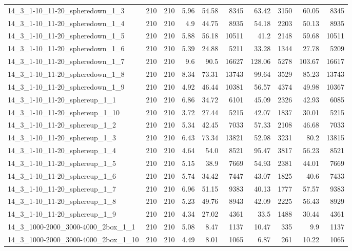 \begin{center}
\begin{scriptsize}
\begin{longtable}{lrrrrrrrrr}
14\_3\_1-10\_11-20\_spheredown\_1\_3 & 210 & 210 & 5.96 & 54.58 & 8345 & 63.42 & 3150 & 60.05 & 8345\\
14\_3\_1-10\_11-20\_spheredown\_1\_4 & 210 & 210 & 4.9 & 44.75 & 8935 & 54.18 & 2203 & 50.13 & 8935\\
14\_3\_1-10\_11-20\_spheredown\_1\_5 & 210 & 210 & 5.88 & 56.18 & 10511 & 41.2 & 2148 & 59.68 & 10511\\
14\_3\_1-10\_11-20\_spheredown\_1\_6 & 210 & 210 & 5.39 & 24.88 & 5211 & 33.28 & 1344 & 27.78 & 5209\\
14\_3\_1-10\_11-20\_spheredown\_1\_7 & 210 & 210 & 9.6 & 90.5 & 16627 & 128.06 & 5278 & 103.67 & 16617\\
14\_3\_1-10\_11-20\_spheredown\_1\_8 & 210 & 210 & 8.34 & 73.31 & 13743 & 99.64 & 3529 & 85.23 & 13743\\
14\_3\_1-10\_11-20\_spheredown\_1\_9 & 210 & 210 & 4.92 & 46.44 & 10381 & 56.57 & 4374 & 49.98 & 10367\\
14\_3\_1-10\_11-20\_sphereup\_1\_1 & 210 & 210 & 6.86 & 34.72 & 6101 & 45.09 & 2326 & 42.93 & 6085\\
14\_3\_1-10\_11-20\_sphereup\_1\_10 & 210 & 210 & 3.72 & 27.44 & 5215 & 42.07 & 1837 & 30.01 & 5215\\
14\_3\_1-10\_11-20\_sphereup\_1\_2 & 210 & 210 & 5.34 & 42.45 & 7033 & 57.33 & 2108 & 46.68 & 7033\\
14\_3\_1-10\_11-20\_sphereup\_1\_3 & 210 & 210 & 6.43 & 73.34 & 13821 & 52.98 & 3231 & 80.2 & 13815\\
14\_3\_1-10\_11-20\_sphereup\_1\_4 & 210 & 210 & 4.64 & 54.0 & 8521 & 95.47 & 3817 & 56.23 & 8521\\
14\_3\_1-10\_11-20\_sphereup\_1\_5 & 210 & 210 & 5.15 & 38.9 & 7669 & 54.93 & 2381 & 44.01 & 7669\\
14\_3\_1-10\_11-20\_sphereup\_1\_6 & 210 & 210 & 5.74 & 34.42 & 7447 & 43.07 & 1825 & 40.6 & 7433\\
14\_3\_1-10\_11-20\_sphereup\_1\_7 & 210 & 210 & 6.96 & 51.15 & 9383 & 40.13 & 1777 & 57.57 & 9383\\
14\_3\_1-10\_11-20\_sphereup\_1\_8 & 210 & 210 & 5.23 & 49.76 & 8943 & 42.09 & 2225 & 56.43 & 8929\\
14\_3\_1-10\_11-20\_sphereup\_1\_9 & 210 & 210 & 4.34 & 27.02 & 4361 & 33.5 & 1488 & 30.44 & 4361\\
14\_3\_1000-2000\_3000-4000\_2box\_1\_1 & 210 & 210 & 5.08 & 8.47 & 1137 & 10.47 & 335 & 9.9 & 1137\\
14\_3\_1000-2000\_3000-4000\_2box\_1\_10 & 210 & 210 & 4.49 & 8.01 & 1065 & 6.87 & 261 & 10.22 & 1065\\

\end{longtable}
\end{scriptsize}
\end{center}
